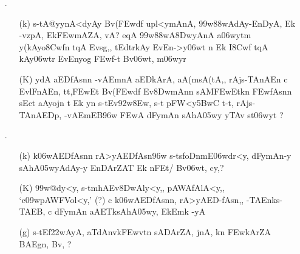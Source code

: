 \begin{itemize}                 
  \item[{\dn \dnnum \rn{31}}.] \begin{itemize}
                 
                 \item[({\dn k})] {\dn s\2-tA@yynA<dyAy Bv(\3FEwd\?f\? upl<ymAnA, \399w\388wAdAy{\rs -\re}\-EnDyA, Ek\2 -vzpA, Ek\2\3FEwmAZA, vA{\rs ?\re} eqA\2 \399w\388wA\38DwyAnA a\306wytm\?{\rs ,\re} y(kAyo{\qvb}\38Cw\?f\?n t\?qA\2 Evsg\0,{\rs ,\re} tEdtrkAy\?{\qvb} EvEn{\rs -\re}\->y\306wt\? n Ek I\38Cwf\2 t\?qA\2 kAy\0\306wtr\? EvEnyog\2 \3FEwf-t\2 Bv\306wt, m\306wy\?r}
                 
                 \item[({\dn K})] {\dn ydA aEDfAsn\?n -vAEmnA aEDkArA, aA(m\-sA(tA,{\rs ,\re} rAjs\2-TAnAEn c EvlFnAEn{\rs ,\re} tt,\3FEwEt Bv(\3FEwd\?f\? Ev\38DwmAn\?n sAM\3FEwEtk\?n \3FEwfAsn\?n sEct aAyojn\2 t\2 Ek y\?n s\2-tEv\392w\38Ew, s\2-t\- pFW\?<y\35BwC t\4-t\4, rAjs\2-TAnAEDp\4, -vAEmEB\396w \3FEwA dFymAn\2 sAhA\305wy\2 yTAv{\rdt} s\2t\306wy\?t {\rs ?\re}}
  
                \end{itemize} 
                
\item[{\dn \dnnum \rn{32}}.] \begin{itemize}
               
               \item[({\dn k})] {\dn k\?\306wAEDfAsn\?n rA>yAEDfAsn\4\396w s\2-ts\2foDn\-mE\306wdr\?<y, dFymAn-y sAhA\305wyAdAy-y EnDA\0rZAT{\rdt} Ek\2 nFEt/\2 Bv\306wt, cy\?,{\rs ?\re}}  
                
               \item[({\dn K})] {\dn \399w@d\?y\?<y, s\2-tmhAEv\38DwAly\?<y,{\rs ,\re} pAWAfAlA<y,{\rs ,\re} {\rs `\re}c\309wpAWFVol\?<y,{\rs '\re} {\rs (?)\re} c k\?\306wAEDfAsn\?n{\rs ,\re} rA>yAED{\rs -\re}\-fAsn\4,{\rs ,\re} -TAEnks\2-TAEB, c dFymAn aAET\0ksAhA\305wy, Ek\2Emk\2 -yA } 
               
               \item[({\dn g})] {\dn s\2-tEf\322wAyA, aT\0dAnv\0k\3FEwvt\0n\? sADArZA, jnA, k\?n \3FEwkAr\?ZA BAEgn, Bv\?, {\rs ?\re}}
               

\end{itemize}
\end{itemize}

